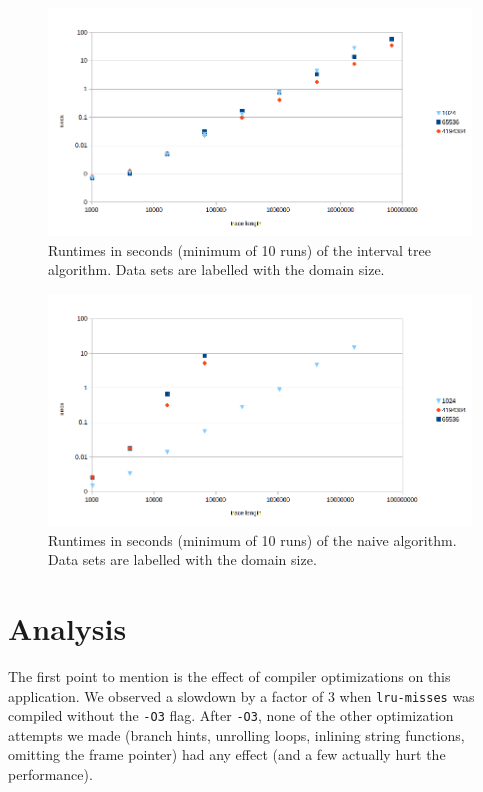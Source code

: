 \documentclass[a4paper,10pt]{article}
\begin{document}
\begin{figure}
\includegraphics[width=\textwidth]{itree}
\caption{Runtimes in seconds (minimum of 10 runs) of the interval tree algorithm.
Data sets are labelled with the domain size.}
\end{figure}

\begin{figure}
\includegraphics[width=\textwidth]{naive}
\caption{Runtimes in seconds (minimum of 10 runs) of the naive algorithm.
Data sets are labelled with the domain size.}
\end{figure}


\section{Analysis}

The first point to mention is the effect of compiler optimizations on this application.
We observed a slowdown by a factor of $3$ when \verb|lru-misses| was compiled without the \verb|-O3| flag.
After \verb|-O3|, none of the other optimization attempts we made (branch hints, unrolling loops, inlining
string functions, omitting the frame pointer) had any effect (and a few actually hurt the
performance).
\end{document}
